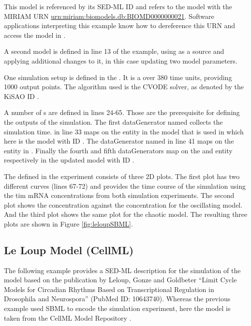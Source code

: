 This model is referenced by its SED-ML ID   and refers to the model with the MIRIAM URN \url{urn:miriam:biomodels.db:BIOMD0000000021}. 
Software applications interpreting this example know how to dereference this URN and access the model in \biom \citep{N+06}.

A second model is defined in line 13 of the example, using  as a source and applying additional changes to it, in this case updating two model parameters.

One simulation setup is defined in the . It is a  over 380 time units, providing 1000 output points. The algorithm used is the CVODE solver, as denoted by the KiSAO ID .

A number of s are defined in lines 24-65. Those are the prerequisite for defining the outputs of the simulation. The first dataGenerator named  collects the simulation time.  in line 33 maps on the  entity in the model that is used in  which here is the model with ID . The dataGenerator named  in line 41 maps on the  entity in . Finally  the fourth and fifth dataGenerators map on the  and  entity respectively in the updated model with ID .

The  defined in the experiment consists of three 2D plots. The first plot has two different curves (lines 67-72) and provides the time course of the simulation using the tim mRNA concentrations from both simulation experiments. The second plot shows the  concentration against the  concentration for the oscillating model. And the third plot shows the same plot for the chaotic model. The resulting three plots are shown in Figure \ref{fig:leloupSBML}. 




\subsection{Le Loup Model (CellML)}
The following example provides a SED-ML description for the simulation of the model based on the publication by Leloup, Gonze and Goldbeter ``Limit Cycle Models for Circadian Rhythms Based on Transcriptional Regulation in Drosophila and Neurospora'' (PubMed ID: 10643740). Whereas the previous example used SBML to encode the simulation experiment, here the model is taken from the CellML Model Repository \citep{LLH+08}. 

